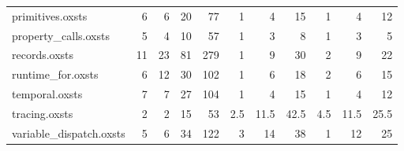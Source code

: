 \begin{tabular}{lrrrrrrrrrr}
primitives.oxsts & 6 & 6 & 20 & 77 & 1 & 4 & 15 & 1 & 4 & 12 \\
property\_calls.oxsts & 5 & 4 & 10 & 57 & 1 & 3 & 8 & 1 & 3 & 5 \\
records.oxsts & 11 & 23 & 81 & 279 & 1 & 9 & 30 & 2 & 9 & 22 \\
runtime\_for.oxsts & 6 & 12 & 30 & 102 & 1 & 6 & 18 & 2 & 6 & 15 \\
temporal.oxsts & 7 & 7 & 27 & 104 & 1 & 4 & 15 & 1 & 4 & 12 \\
tracing.oxsts & 2 & 2 & 15 & 53 & 2.5 & 11.5 & 42.5 & 4.5 & 11.5 & 25.5 \\
variable\_dispatch.oxsts & 5 & 6 & 34 & 122 & 3 & 14 & 38 & 1 & 12 & 25 \\
\bottomrule
\end{tabular}
